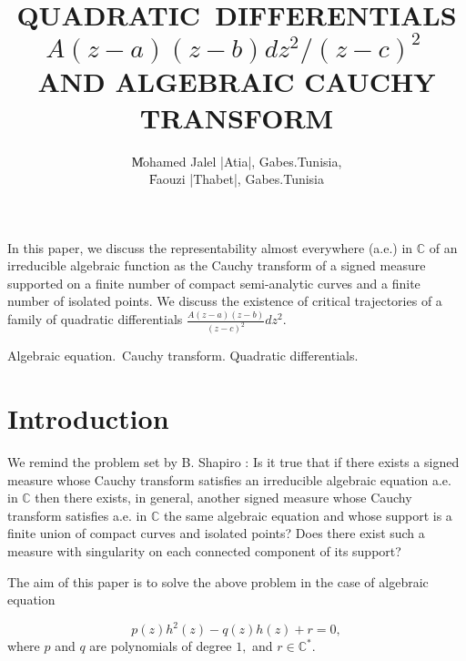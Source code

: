 \documentclass[12pt]{amsart}
\begin{document}
\newtheorem{The}{Theorem}[section]




\title{QUADRATIC\ DIFFERENTIALS $A\left( z-a\right) \left( z-b\right)
dz^{2}/(z-c)^{2}\ $ AND ALGEBRAIC CAUCHY TRANSFORM}

\author{\|Mohamed Jalel |Atia|, Gabes.Tunisia,
        \\ \|Faouzi |Thabet|, Gabes.Tunisia}



\abstract  In this paper, we discuss the
representability almost everywhere (a.e.) in $\mathbb{C}$ of an irreducible algebraic function as the Cauchy transform of a signed
measure supported on a finite number of compact semi-analytic curves and a
finite number of isolated points. We discuss the existence of critical
trajectories of a family of quadratic differentials $\displaystyle\frac{A\left( z-a\right) \left( z-b\right) }{(z-c)^{2}}dz^{2}$.
\endabstract

\keywords
  Algebraic equation.\ Cauchy transform. Quadratic differentials.
\endkeywords


\section{Introduction}
We remind the problem set by B. Shapiro \cite{shapiro}: Is it true that if
there exists a signed measure whose Cauchy transform satisfies an
irreducible algebraic equation a.e. in $\mathbb{C}
$ then there exists, in general, another signed measure whose Cauchy
transform satisfies a.e. in $\mathbb{C}
$ the same algebraic equation and whose support is a finite union of compact
curves and isolated points? Does there exist such a measure with singularity
on each connected component of its support?

\bigskip

The aim of this paper is to solve the above problem in the case of algebraic
equation

\begin{equation}
p\left( z\right) h^{2}\left( z\right) -q\left( z\right) h\left( z\right)
+r=0,  \label{eq alg}
\end{equation}where $p$ and $q$ are polynomials of degree $1,$ and $r\in 
\mathbb{C}
^{\ast }$.
\end{document}
